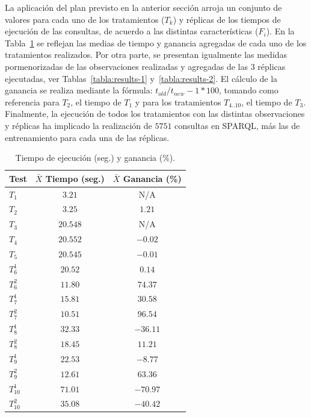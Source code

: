\documentclass[a4paper,final,11pt,fleqn,twoside]{book}  %
\begin{document}
La aplicación del plan previsto en la anterior sección arroja un conjunto de valores para cada uno de los tratamientos ($T_k$) y réplicas de los tiempos 
de ejecución de las consultas, de acuerdo a las distintas características ($F_i$). En la Tabla~\ref{tabla:tests-agregado} se reflejan 
las medias de tiempo y ganancia agregadas de cada uno de los tratamientos realizados. Por otra parte, se presentan igualmente 
las medidas pormenorizadas de las observaciones realizadas y agregadas de las 3 réplicas ejecutadas, ver Tablas~\ref{tabla:results-1} y~\ref{tabla:results-2}. 
El cálculo de la ganancia se realiza mediante la fórmula: $t_{old}/t_{new}-1*100$, tomando como referencia para $T_2$, el tiempo de $T_1$ y para 
los tratamientos $T_{4..10}$, el tiempo de $T_3$. Finalmente, la ejecución de todos los tratamientos con las distintas observaciones y 
réplicas ha implicado la realización de $5751$ consultas en SPARQL, más las de entrenamiento para cada una de las réplicas. 

\begin{table}[!htb]
\renewcommand{\arraystretch}{1.3}
\begin{center}
\begin{tabular}{|l|c|c|}
\hline
  \textbf{Test}& \textbf{$\bar{X}$ Tiempo (seg.)} & \textbf{$\bar{X}$ Ganancia (\%)} \\ \hline
   $T_1$ & $3.21$  & N/A\\ \hline 
   $T_2$ & $3.25$  & $1.21$   \\ \hline 
   $T_3$ & $20.548$ & N/A   \\ \hline 
   $T_4$ & $20.552$ & $-0.02$ \\ \hline 
   $T_5$ & $20.545$ & $-0.01$ \\ \hline 
   $T^{1}_6$ & $20.52$  & $0.14$\\ \hline 
   $T^{2}_6$ & $11.80$ & $74.37$\\ \hline 
   $T^{1}_7$ & $15.81$ & $30.58$ \\ \hline 
   \textbf{$T^{2}_7$} & \textbf{$10.51$} & \textbf{$96.54$} \\ \hline
   $T^{1}_8$ & $32.33$ & $-36.11$ \\ \hline 
   $T^{2}_8$ & $18.45$ & $11.21$ \\ \hline 
   $T^{1}_9$ & $22.53$ & $-8.77$ \\ \hline 
   $T^{2}_9$ & $12.61$ & $63.36$ \\ \hline 
   \textbf{$T^{1}_{10}$} & \textbf{$71.01$} & $-70.97$ \\ \hline 
   $T^{2}_{10}$ & $35.08$ & $-40.42$ \\ \hline 
  \hline
  \end{tabular}
  \caption{Tiempo de ejecución (seg.) y ganancia (\%).}
  \label{tabla:tests-agregado}
  \end{center}
\end{table} 
\end{document}
